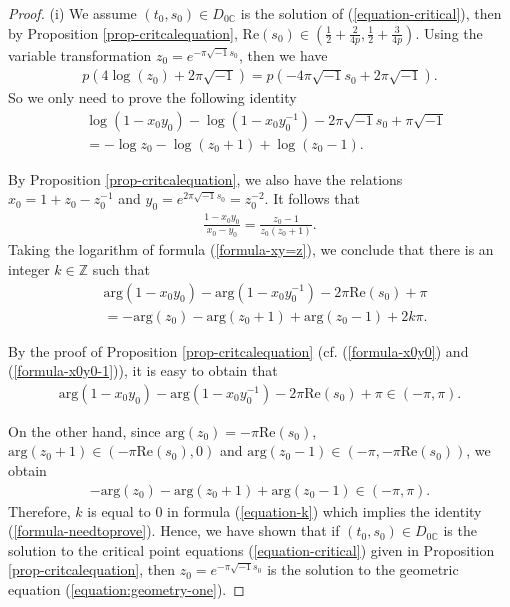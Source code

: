 \documentclass[12pt]{amsart}
\begin{document}
\begin{proof}
(i) We assume $(t_0,s_0)\in D_{0\mathbb{C}}$ is the solution of (\ref{equation-critical}), then by Proposition \ref{prop-critcalequation}, 
$\text{Re}(s_0)\in \left(\frac{1}{2}+\frac{2}{4p},\frac{1}{2}+\frac{3}{4p}\right)$. 
Using the variable transformation $z_0=e^{-\pi \sqrt{-1}s_0}$, then we have
\begin{align} \label{equation-p}
    p\left(4\log \left(z_0\right)+2\pi \sqrt{-1}\right)=p(-4\pi\sqrt{-1}s_0+2\pi\sqrt{-1}).
\end{align}
So we only need to prove the following identity 
\begin{align} \label{formula-needtoprove}
    &\log\left(1-x_0y_0\right)-\log\left({1-x_0y_0^{-1}}\right)-2\pi\sqrt{-1}s_0+\pi\sqrt{-1}\\\nonumber
    &=-\log z_0-\log (z_0+1)+\log(z_0-1).
\end{align}

By Proposition \ref{prop-critcalequation}, we also have the relations $x_0=1+z_0-z_0^{-1}$ and
$y_0=e^{2\pi \sqrt{-1}s_0}=z_0^{-2}$. 
It follows that
\begin{align} \label{formula-xy=z}
    \frac{1-x_0y_0}{x_0-y_0}=\frac{z_0-1}{z_0(z_0+1)}.
\end{align}
Taking the logarithm of formula (\ref{formula-xy=z}), we conclude that there is an integer $k\in \mathbb{Z}$ such that 
\begin{align} \label{equation-k}
   & \text{arg}\left(1-x_0y_0\right)-\text{arg}(1-x_0y_0^{-1})-2\pi \text{Re}(s_0)+\pi\\\nonumber
   &=-\text{arg} (z_0)-\text{arg}(z_0+1)+\text{arg}(z_0-1)+2k\pi.
\end{align}

By the proof of Proposition \ref{prop-critcalequation} (cf. (\ref{formula-x0y0}) and (\ref{formula-x0y0-1})), it is easy to obtain that 
\begin{align}
     \text{arg}\left(1-x_0y_0\right)-\text{arg}(1-x_0y_0^{-1})-2\pi \text{Re}(s_0)+\pi\in (-\pi,\pi).
\end{align}

On the other hand, since $\text{arg} (z_0)=-\pi \text{Re} (s_0)$, $\text{arg}(z_0+1)\in (-\pi \text{Re}(s_0),0)$ and $\text{arg}(z_0-1)\in (-\pi,-\pi \text{Re}(s_0))$, we obtain
\begin{align}
    -\text{arg}(z_0)-\text{arg}(z_0+1)+\text{arg}(z_0-1)\in (-\pi,\pi).  
\end{align}
Therefore, $k$ is equal to $0$ in formula (\ref{equation-k}) which implies the identity (\ref{formula-needtoprove}). 
Hence, we have shown that if $(t_0,s_0)\in D_{0\mathbb{C}}$ is the solution to the critical point equations (\ref{equation-critical}) given in Proposition \ref{prop-critcalequation}, then $z_0=e^{-\pi\sqrt{-1}s_0}$ is the solution to the geometric equation (\ref{equation:geometry-one}). 


\end{proof}
\end{document}
